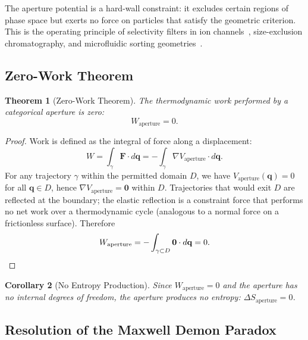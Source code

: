 \documentclass[10pt,twocolumn]{article}
\newtheorem{theorem}{Theorem}[section]
\newtheorem{corollary}[theorem]{Corollary}
\theoremstyle{definition}
\theoremstyle{remark}
\begin{document}
The aperture potential is a hard-wall constraint: it excludes
certain regions of phase space but exerts no force on particles
that satisfy the geometric criterion.  This is the operating
principle of selectivity filters in ion channels~\cite{Doyle1998},
size-exclusion chromatography, and microfluidic sorting
geometries~\cite{Whitesides2006,Stone2004}.

\subsection{Zero-Work Theorem}

\begin{theorem}[Zero-Work Theorem]\label{thm:zerowork}
The thermodynamic work performed by a categorical aperture is zero:
\begin{equation}
  \boxed{W_{\text{aperture}} = 0.}
\end{equation}
\end{theorem}

\begin{proof}
Work is defined as the integral of force along a displacement:
\begin{equation}
  W = \int_{\gamma} \mathbf{F} \cdot d\mathbf{q}
    = -\int_{\gamma} \nabla V_{\text{aperture}} \cdot d\mathbf{q}.
\end{equation}
For any trajectory $\gamma$ within the permitted domain $D$, we have
$V_{\text{aperture}}(\mathbf{q}) = 0$ for all $\mathbf{q} \in D$,
hence $\nabla V_{\text{aperture}} = \mathbf{0}$ within $D$.
Trajectories that would exit $D$ are reflected at the boundary;
the elastic reflection is a constraint force that performs no net work
over a thermodynamic cycle (analogous to a normal force on a
frictionless surface).  Therefore
\begin{equation}
  W_{\text{aperture}} = -\int_{\gamma \subset D}
  \mathbf{0} \cdot d\mathbf{q} = 0. \qedhere
\end{equation}
\end{proof}

\begin{corollary}[No Entropy Production]
Since $W_{\text{aperture}} = 0$ and the aperture has no internal
degrees of freedom, the aperture produces no entropy:
$\Delta S_{\text{aperture}} = 0$.
\end{corollary}

\subsection{Resolution of the Maxwell Demon Paradox}
\end{document}
